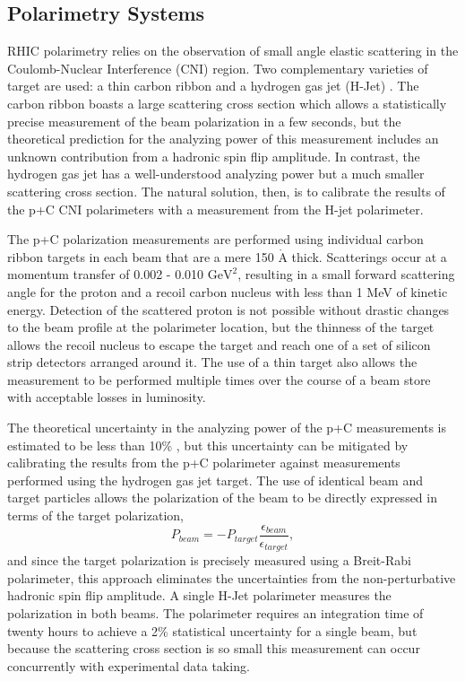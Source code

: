 \subsection{Polarimetry Systems}

RHIC polarimetry relies on the observation of small angle elastic scattering
in the Coulomb-Nuclear Interference (CNI) region. Two complementary varieties
of target are used: a thin carbon ribbon \cite{Jinnouchi:2004up} and a
hydrogen gas jet (H-Jet) \cite{Zelenski:2005mz, Okada:2006dd}. The carbon
ribbon boasts a large scattering cross section which allows a statistically
precise measurement of the beam polarization in a few seconds, but the
theoretical prediction for the analyzing power of this measurement includes an
unknown contribution from a hadronic spin flip amplitude. In contrast, the
hydrogen gas jet has a well-understood analyzing power but a much smaller
scattering cross section. The natural solution, then, is to calibrate the
results of the p+C CNI polarimeters with a measurement from the H-jet
polarimeter.

The p+C polarization measurements are performed using individual carbon ribbon
targets in each beam that are a mere 150 $\mathrm{\mathring{A}}$ thick.
Scatterings occur at a momentum transfer of 0.002 - 0.010 $\mathrm{GeV}^2$,
resulting in a small forward scattering angle for the proton and a recoil
carbon nucleus with less than 1 MeV of kinetic energy. Detection of the
scattered proton is not possible without drastic changes to the beam profile
at the polarimeter location, but the thinness of the target allows the recoil
nucleus to escape the target and reach one of a set of silicon strip detectors
arranged around it. The use of a thin target also allows the measurement to be
performed multiple times over the course of a beam store with acceptable
losses in luminosity.

The theoretical uncertainty in the analyzing power of the p+C measurements is
estimated to be less than 10\% \cite{Alekseev:2003sk}, but this uncertainty
can be mitigated by calibrating the results from the p+C polarimeter against
measurements performed using the hydrogen gas jet target. The use of identical
beam and target particles allows the polarization of the beam to be directly
expressed in terms of the target polarization,
%
\begin{equation}
  P_{beam} = -P_{target}\frac{\epsilon_{beam}}{\epsilon_{target}},
\end{equation}
%
and since the target polarization is precisely measured using a Breit-Rabi
polarimeter, this approach eliminates the uncertainties from the
non-perturbative hadronic spin flip amplitude. A single H-Jet polarimeter
measures the polarization in both beams. The polarimeter requires an
integration time of twenty hours to achieve a 2\% statistical uncertainty for
a single beam, but because the scattering cross section is so small this
measurement can occur concurrently with experimental data taking.

